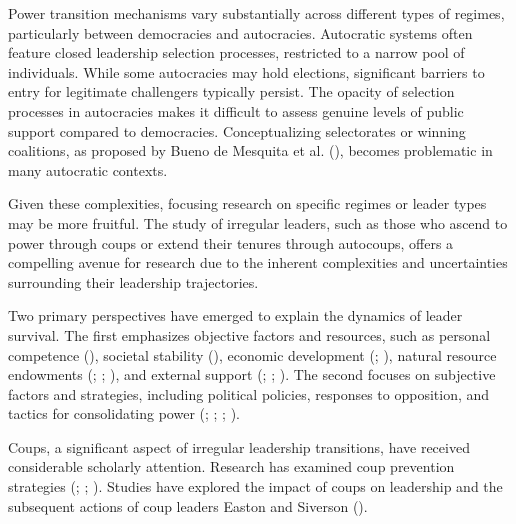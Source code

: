 \documentclass[
  12pt,
]{report}
\begin{document}
Power transition mechanisms vary substantially across different types of
regimes, particularly between democracies and autocracies. Autocratic
systems often feature closed leadership selection processes, restricted
to a narrow pool of individuals. While some autocracies may hold
elections, significant barriers to entry for legitimate challengers
typically persist. The opacity of selection processes in autocracies
makes it difficult to assess genuine levels of public support compared
to democracies. Conceptualizing selectorates or winning coalitions, as
proposed by Bueno de Mesquita et al.
(), becomes problematic in many
autocratic contexts.

Given these complexities, focusing research on specific regimes or
leader types may be more fruitful. The study of irregular leaders, such
as those who ascend to power through coups or extend their tenures
through autocoups, offers a compelling avenue for research due to the
inherent complexities and uncertainties surrounding their leadership
trajectories.

Two primary perspectives have emerged to explain the dynamics of leader
survival. The first emphasizes objective factors and resources, such as
personal competence (),
societal stability (), economic
development (;
), natural resource endowments
(;
;
), and
external support (;
; ). The second focuses on subjective factors and
strategies, including political policies, responses to opposition, and
tactics for consolidating power (; ;
;
).

Coups, a significant aspect of irregular leadership transitions, have
received considerable scholarly attention. Research has examined coup
prevention strategies (;
; ). Studies have explored the impact of coups on leadership
and the subsequent actions of coup leaders Easton and Siverson
().
\end{document}
